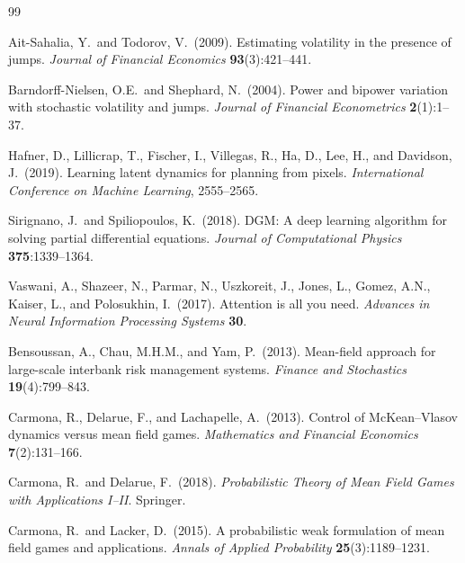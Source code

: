 \documentclass[12pt,a4paper]{article}
\theoremstyle{plain}
\theoremstyle{definition}
\newcommand{\1}{\mathbbm{1}}
\begin{document}

\begin{thebibliography}{99}

Ait-Sahalia, Y.\ and Todorov, V.\ (2009).
Estimating volatility in the presence of jumps.
\textit{Journal of Financial Economics} \textbf{93}(3):421--441.

Barndorff-Nielsen, O.E.\ and Shephard, N.\ (2004).
Power and bipower variation with stochastic volatility and jumps.
\textit{Journal of Financial Econometrics} \textbf{2}(1):1--37.

Hafner, D., Lillicrap, T., Fischer, I., Villegas, R., Ha, D., Lee, H., and Davidson, J.\ (2019).
Learning latent dynamics for planning from pixels.
\textit{International Conference on Machine Learning}, 2555--2565.

Sirignano, J.\ and Spiliopoulos, K.\ (2018).
DGM: A deep learning algorithm for solving partial differential equations.
\textit{Journal of Computational Physics} \textbf{375}:1339--1364.

Vaswani, A., Shazeer, N., Parmar, N., Uszkoreit, J., Jones, L., Gomez, A.N., Kaiser, L., and Polosukhin, I.\ (2017).
Attention is all you need.
\textit{Advances in Neural Information Processing Systems} \textbf{30}.

Bensoussan, A., Chau, M.H.M., and Yam, P.\ (2013).
Mean-field approach for large-scale interbank risk management systems.
\textit{Finance and Stochastics} \textbf{19}(4):799--843.

Carmona, R., Delarue, F., and Lachapelle, A.\ (2013).
Control of McKean--Vlasov dynamics versus mean field games.
\textit{Mathematics and Financial Economics} \textbf{7}(2):131--166.

Carmona, R.\ and Delarue, F.\ (2018).
\textit{Probabilistic Theory of Mean Field Games with Applications I--II}.
Springer.

Carmona, R.\ and Lacker, D.\ (2015).
A probabilistic weak formulation of mean field games and applications.
\textit{Annals of Applied Probability} \textbf{25}(3):1189--1231.


\end{thebibliography}
\end{document}
